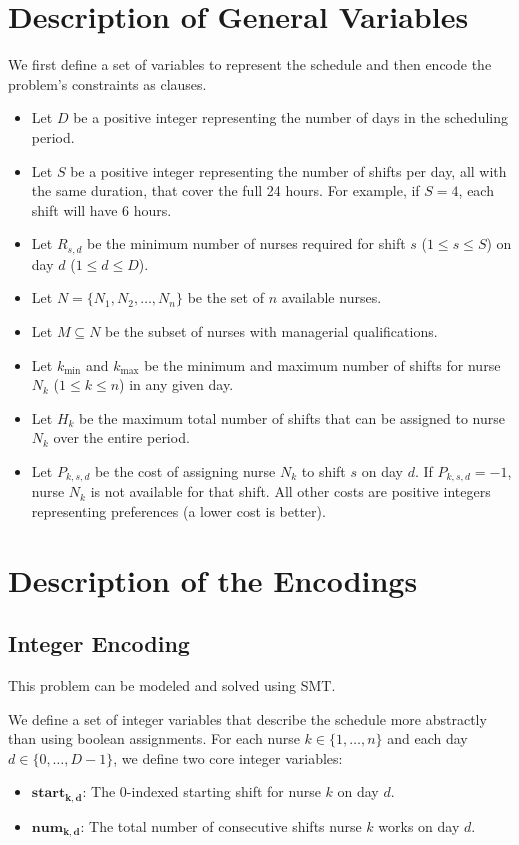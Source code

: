 \documentclass[sigconf, 10pt]{acmart}
\begin{document}
\section{Description of General Variables}

We first define a set of variables to represent the schedule and then encode the problem's constraints as clauses.

\begin{itemize}
    \item Let $D$ be a positive integer representing the number of days in the scheduling period.
    \item Let $S$ be a positive integer representing the number of shifts per day, all with the same duration, that cover the full 24 hours. For example, if $S = 4$, each shift will have 6 hours.
    \item Let $R_{s,d}$ be the minimum number of nurses required for shift $s$ ($1 \le s \le S$) on day $d$ ($1 \le d \le D$).
    \item Let $N = \{N_1, N_2, \dots, N_n\}$ be the set of $n$ available nurses.
    \item Let $M \subseteq N$ be the subset of nurses with managerial qualifications.
    \item Let $k_{\min}$ and $k_{\max}$ be the minimum and maximum number of shifts for nurse $N_k$ ($1 \le k \le n$) in any given day.
    \item Let $H_k$ be the maximum total number of shifts that can be assigned to nurse $N_k$ over the entire period.
    \item Let $P_{k,s,d}$ be the cost of assigning nurse $N_k$ to shift $s$ on day $d$. If $P_{k,s,d} = -1$, nurse $N_k$ is not available for that shift. All other costs are positive integers representing preferences (a lower cost is better).
\end{itemize}

\section{Description of the Encodings}

\subsection{Integer Encoding}
This problem can be modeled and solved using SMT. 

We define a set of integer variables that describe the schedule more abstractly than using boolean assignments. For each nurse $k \in \{1, \dots, n\}$ and each day $d \in \{0, \dots, D-1\}$, we define two core integer variables:
\begin{itemize}
    \item $\mathbf{start_{k,d}}$: The 0-indexed starting shift for nurse $k$ on day $d$.
    \item $\mathbf{num_{k,d}}$: The total number of consecutive shifts nurse $k$ works on day $d$.
\end{itemize}
\end{document}
